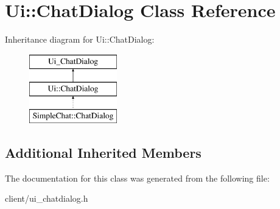 \hypertarget{classUi_1_1ChatDialog}{\section{Ui\-:\-:Chat\-Dialog Class Reference}
\label{classUi_1_1ChatDialog}
}
Inheritance diagram for Ui\-:\-:Chat\-Dialog\-:\begin{figure}[H]
\begin{center}
\leavevmode
\includegraphics[height=3.000000cm]{classUi_1_1ChatDialog}
\end{center}
\end{figure}
\subsection*{Additional Inherited Members}


The documentation for this class was generated from the following file\-:\begin{DoxyCompactItemize}
\item 
client/ui\-\_\-chatdialog.\-h\end{DoxyCompactItemize}
